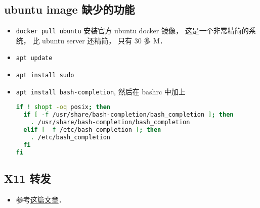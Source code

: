 \subsection{ubuntu image 缺少的功能}
\begin{itemize}
\item \verb|docker pull ubuntu| 安装官方 ubuntu docker 镜像， 这是一个非常精简的系统， 比 ubuntu server 还精简， 只有 30 多 M．
\item \verb|apt update|
\item \verb`apt install sudo`
\item \verb`apt install bash-completion`, 然后在 bashrc 中加上
\begin{lstlisting}[language=bash]
if ! shopt -oq posix; then
  if [ -f /usr/share/bash-completion/bash_completion ]; then
    . /usr/share/bash-completion/bash_completion
  elif [ -f /etc/bash_completion ]; then
    . /etc/bash_completion
  fi
fi
\end{lstlisting}
\end{itemize}

\subsection{X11 转发}
\begin{itemize}
\item 参考\href{https://opendata-forum.cern.ch/t/x11-forwarding-with-docker/31}{这篇文章}．
\end{itemize}
